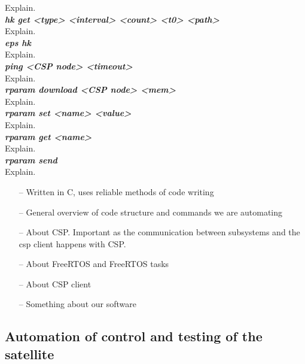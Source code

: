 \documentclass[english,12pt,a4paper,pdftex,elec,utf8]{aaltothesis}
\begin{document}
Explain.\\ 
\textit{\textbf{hk get <type> <interval> <count> <t0> <path>}}\\
Explain.\\
\textit{\textbf{eps hk}}\\
Explain.\\ 
\textit{\textbf{ping <CSP node> <timeout>}}\\
Explain.\\
\textit{\textbf{rparam download <CSP node> <mem>}}\\
Explain.\\ 
\textit{\textbf{rparam set <name> <value>}}\\
Explain.\\ 
\textit{\textbf{rparam get <name>}}\\
Explain.\\ 
\textit{\textbf{rparam send}}\\
Explain.\\ 
\begin{itemize}
\item[--]Written in C, uses reliable methods of code writing
\item[--]General overview of code structure and commands we are automating
\item[--]About CSP. Important as the communication between 
subsystems and the csp client happens with CSP.
\item[--]About FreeRTOS and FreeRTOS tasks
\item[--]About CSP client
\item[--]Something about our software
\end{itemize}
\subsection{Automation of control and testing of the satellite}
\end{document}
